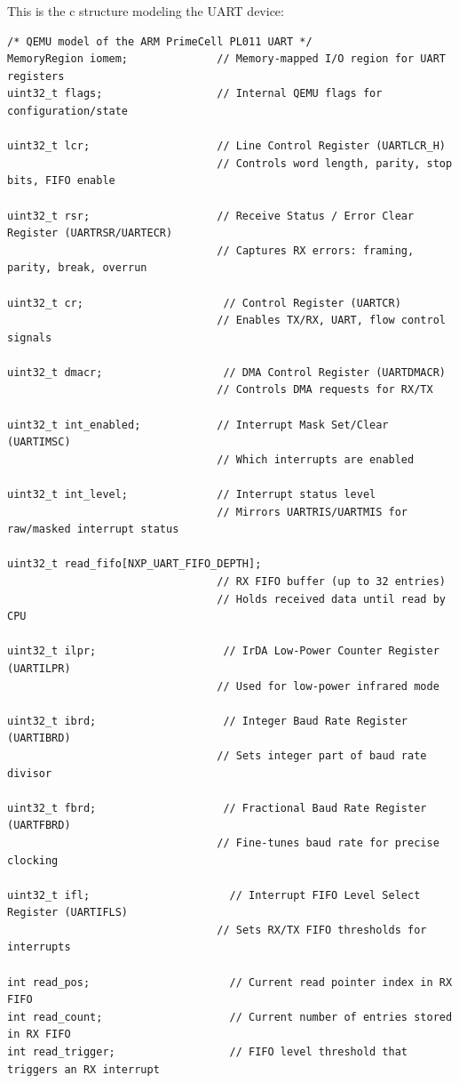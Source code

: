 \documentclass{article}
\begin{document}
This is the c structure modeling the UART device:
\begin{verbatim}
/* QEMU model of the ARM PrimeCell PL011 UART */
MemoryRegion iomem;              // Memory-mapped I/O region for UART registers
uint32_t flags;                  // Internal QEMU flags for configuration/state

uint32_t lcr;                    // Line Control Register (UARTLCR_H)
                                 // Controls word length, parity, stop bits, FIFO enable

uint32_t rsr;                    // Receive Status / Error Clear Register (UARTRSR/UARTECR)
                                 // Captures RX errors: framing, parity, break, overrun

uint32_t cr;                      // Control Register (UARTCR)
                                 // Enables TX/RX, UART, flow control signals

uint32_t dmacr;                   // DMA Control Register (UARTDMACR)
                                 // Controls DMA requests for RX/TX

uint32_t int_enabled;            // Interrupt Mask Set/Clear (UARTIMSC)
                                 // Which interrupts are enabled

uint32_t int_level;              // Interrupt status level
                                 // Mirrors UARTRIS/UARTMIS for raw/masked interrupt status

uint32_t read_fifo[NXP_UART_FIFO_DEPTH]; 
                                 // RX FIFO buffer (up to 32 entries)
                                 // Holds received data until read by CPU

uint32_t ilpr;                    // IrDA Low-Power Counter Register (UARTILPR)
                                 // Used for low-power infrared mode

uint32_t ibrd;                    // Integer Baud Rate Register (UARTIBRD)
                                 // Sets integer part of baud rate divisor

uint32_t fbrd;                    // Fractional Baud Rate Register (UARTFBRD)
                                 // Fine-tunes baud rate for precise clocking

uint32_t ifl;                      // Interrupt FIFO Level Select Register (UARTIFLS)
                                 // Sets RX/TX FIFO thresholds for interrupts

int read_pos;                      // Current read pointer index in RX FIFO
int read_count;                    // Current number of entries stored in RX FIFO
int read_trigger;                  // FIFO level threshold that triggers an RX interrupt


\end{verbatim}
\end{document}
